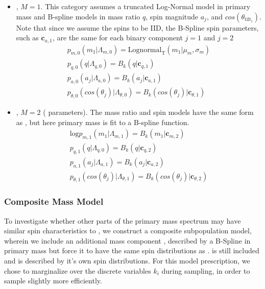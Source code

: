 \begin{itemize}
    \item \first{}, $M=1$. This category assumes a truncated Log-Normal model in primary mass and B-spline models in mass ratio $q$, spin magnitude $a_j$, and $cos(\theta_{\text{tilt}_i})$. Note that since we assume the spins to be IID, the B-Spline spin parameters, such as $\mathbf{c}_{a,1}$, are the same for each binary component $j=1$ and $j=2$
    \begin{eqnarray} \label{eq:lowmass}
        p_{m,0}(m_1| \Lambda_{m,0}) = \text{Lognormal}_\text{T}(m_1 | \mu_{m}, \sigma_{m}) \\
        p_{q,0}(q| \Lambda_{q,0}) = B_k(q | \mathbf{c}_{q,1}) \\
        p_{a,0}(a_j| \Lambda_{a,0}) = B_k(a_j | \mathbf{c}_{a,1}) \\
        p_{\theta,0}(cos(\theta_j)| \Lambda_{\theta,0}) = B_k( cos(\theta_j) | \mathbf{c}_{\theta,1})
    \end{eqnarray}

    \item \contB{}, $M=2$ ( parameters). The mass ratio and spin models have the same form as \first{}, but here primary mass is fit to a B-spline function. 
    \begin{eqnarray} \label{eq:contmass}
        \text{log} p_{m,1}(m_1| \Lambda_{m,1}) = B_k(m_1 | \mathbf{c}_{m, 2}) \\
        p_{q,1}(q| \Lambda_{q,0}) = B_k(q | \mathbf{c}_{q,2}) \\
        p_{a,1}(a_j| \Lambda_{a,1}) = B_k(a_j | \mathbf{c}_{a,2}) \\
        p_{\theta,1}(cos(\theta_j)| \Lambda_{\theta,1}) = B_k( cos(\theta_j) | \mathbf{c}_{\theta,2})
    \end{eqnarray}
    
\end{itemize}

\subsubsection{Composite Mass Model}

To investigate whether other parts of the primary mass spectrum may have similar spin characteristics to \first{}, we construct a composite subpopulation model, wherein we include an additional mass component \contA{}, described by a B-Spline in primary mass but force it to have the same spin distributions as \first{}. \contB is still included and is described by it's own spin distributions. For this model prescription, we chose to marginalize over the discrete variables $k_i$ during sampling, in order to sample slightly more efficiently. 

